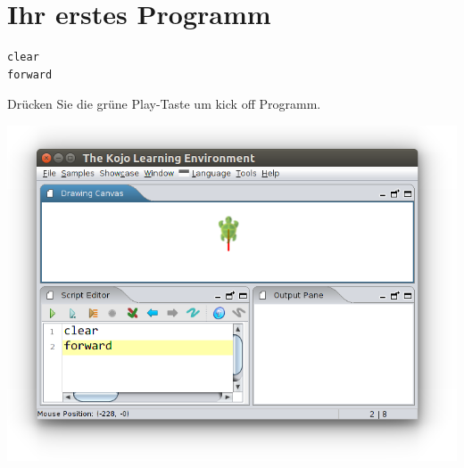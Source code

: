 \chapter{Ihr erstes Programm}
\begin{multicols}{2}

\begin{lstlisting}[basicstyle={\ttfamily\fontsize{36}{43}\selectfont},numbers=none]
clear
forward
\end{lstlisting}
        
Drücken Sie die grüne Play-Taste um kick off Programm.

\columnbreak

\begin{center}
\includegraphics[width=14.0cm]{../img/forward.png}
\end{center}

\end{multicols}

